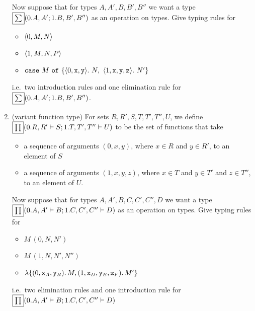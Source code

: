 \documentclass[runningheads,12pt]{llncs}
\newcommand{\leftconn}{\framebox{$\tesum$}}
\newcommand{\rightconn}{\framebox{$\teprod$}}
\newcommand{\lefttagp}{0}
\newcommand{\righttagp}{1}
\begin{document}
\begin{enumerate}
Now suppose that for types $A,A',B,B',B''$ we want a type $\leftconn(0.A,A';1.B,B',B'')$ as an operation on types.  Give typing rules for
\begin{itemize}
\item $\tuple{\lefttagp,M,N}$
\item $\tuple{\righttagp,M,N,P}$
\item $\ttcase M \ttof \{\tuple{\lefttagp,\ttx,\tty}.\ N,\ \tuple{\righttagp,\ttx,\tty,\ttz}.\ N'\}$
\end{itemize}
i.e.\ two introduction rules and one elimination rule for $\leftconn(0.A,A';1.B,B',B'')$.
\item (variant function type) For sets $R,R',S,T,T',T'',U$, we define $\rightconn(0.R,R' \vdash S; 1.T,T',T'' \vdash U)$ to be the set of functions that take
  \begin{itemize}
  \item a sequence of arguments $(\lefttagp, x , y)$, where $x \in R$ and $y \in R'$, to an element of $S$
  \item a sequence of arguments $(\righttagp, x, y, z)$, where $x \in T$ and $y \in T'$ and $z \in T''$, to an element of $U$.
  \end{itemize}

Now suppose that for types $A,A',B,C,C',C'',D$ we want a type $\rightconn(0. A, A' \vdash B ; 1. C,C',C'' \vdash D)$ as an operation on types.  Give typing rules for
\begin{itemize}
\item $M\,(\lefttagp,N,N')$
\item $M\,(\righttagp,N,N',N'')$
\item $\lambda \{ (\lefttagp,\ttx_{A},\tty_{B}).\,M, (\righttagp,\ttx_{D},\tty_{E},\ttz_{F}).\,M' \}$
\end{itemize}
i.e.\ two elimination rules and one introduction rule for $\rightconn(0.A, A' \vdash B ; 1. C,C',C'' \vdash D)$
\end{enumerate}



\end{document}

